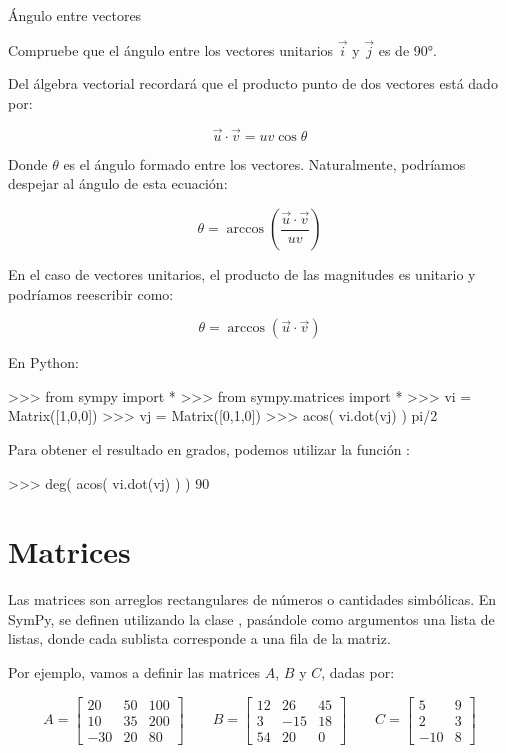 \begin{ejemplo}{Ángulo entre vectores}

Compruebe que el ángulo entre los vectores unitarios $\vec{i}$ y $\vec{j}$ es de 90°.

\solu

Del álgebra vectorial recordará que el producto punto de dos vectores está dado por:

$$ \vec{u} \cdot \vec{v} = uv \cos\theta $$

Donde $ \theta $ es el ángulo formado entre los vectores. Naturalmente, podríamos 
despejar al ángulo de esta ecuación:

$$ \theta = \arccos \left( \frac{ \vec{u} \cdot \vec{v} }{uv} \right) $$

En el caso de vectores unitarios, el producto de las magnitudes es unitario y podríamos reescribir como:

$$ \theta = \arccos \left( \vec{u} \cdot \vec{v} \right) $$

En Python:

\begin{python}
>>> from sympy import *
>>> from sympy.matrices import *
>>> vi = Matrix([1,0,0])
>>> vj = Matrix([0,1,0])
>>> acos( vi.dot(vj) )
pi/2
\end{python}

Para obtener el resultado en grados, podemos utilizar la función :

\begin{python}
>>> deg( acos( vi.dot(vj) ) )
90
\end{python}


\end{ejemplo}



\section{Matrices}

Las matrices son arreglos rectangulares de números o cantidades simbólicas. En SymPy, 
se definen utilizando la clase , pasándole como argumentos una lista de 
listas, donde cada sublista corresponde a una fila de la matriz.

Por ejemplo, vamos a definir las matrices $A$, $B$ y $C$, dadas por:

$$ A = \begin{bmatrix}
20 & 50 & 100 \\
10 & 35 & 200 \\
-30 & 20 & 80 
\end{bmatrix}
\qquad
B = \begin{bmatrix}
12 & 26 & 45 \\
3 & -15 & 18 \\
54 & 20 & 0 
\end{bmatrix}
\qquad
C = \begin{bmatrix}
5 & 9 \\
2 & 3 \\
-10 & 8
\end{bmatrix}
 $$

